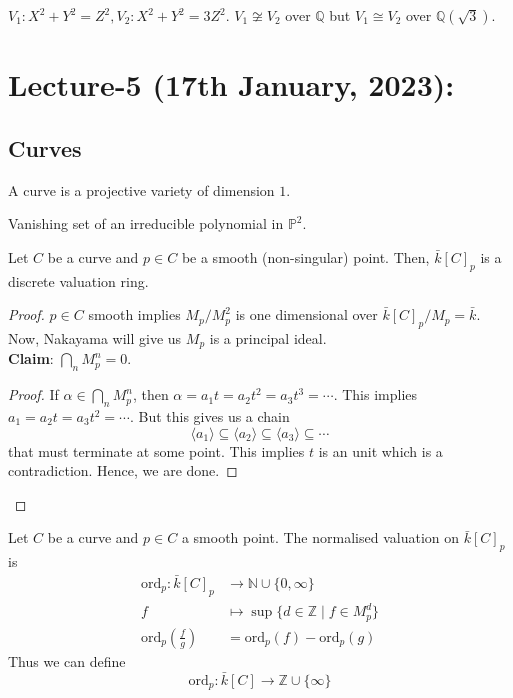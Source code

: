 \documentclass[oneside, 12pt, ]{scrbook}
\newcommand{\NN}{\mathbb N}
\newcommand{\QQ}{\mathbb Q}
\newcommand{\ZZ}{\mathbb Z}
\newcommand{\PP}{\mathbb{P}}
\theoremstyle{theorem}
\begin{document}
\begin{example}
$V_{1}: X^2 + Y^2 = Z^2 , V_{2}: X^2 + Y^2 = 3Z^2$. $V_{1} \not \cong V_{2}$ over $\QQ$ but $V_{1}\cong V_{2}$ over $\QQ(\sqrt{3})$.
\end{example}

\chapter{Lecture-5 (17th January, 2023):}

\section{Curves}

\begin{definition}
A curve is a projective variety of dimension $1$.
\end{definition}

\begin{example}
Vanishing set of an irreducible polynomial in $\PP^2$.
\end{example}

\begin{proposition}
Let $C$ be a curve and $p \in C$ be a smooth (non-singular) point. Then, $\bar{k}[C]_{p}$ is a discrete valuation ring.
\end{proposition}

\begin{proof}
$p \in C$ smooth implies $M_{p}/M_{p}^2$ is one dimensional over $\bar{k}[C]_{p}/M_{p} = \bar{k}$. Now, Nakayama will give us $M_{p}$ is a principal ideal. \\

\textbf{Claim}:
$\bigcap_{n} M_{p}^n = 0$.

\begin{proof}
If $\alpha \in \bigcap_{n} M_{p}^n$, then $\alpha = a_{1}t = a_{2} t^2 = a_{3} t^3 = \cdots $. This implies $a_{1} = a_{2}t = a_{3}t^2 = \cdots $. But this gives us a chain $$\langle a_{1} \rangle \subseteq \langle a_{2} \rangle \subseteq \langle a_{3} \rangle \subseteq \cdots $$ that must terminate at some point. This implies $t$ is an unit which is a contradiction. Hence, we are done.
\end{proof}
\end{proof}

\begin{definition}
Let $C$ be a curve and $p \in C$ a smooth point. The normalised valuation on $\bar{k}[C]_{p}$ is 
\begin{align*}
\mathrm{ord}_{p}: \bar{k}[C]_{p} &\rightarrow \NN \cup \{0, \infty\} \\
f &\mapsto \sup \{d \in \ZZ \mid f \in M_{p}^d \} \\
\mathrm{ord}_{p}(\frac{f}{g}) &= \mathrm{ord}_{p}(f) - \mathrm{ord}_{p}(g)
\end{align*}
Thus we can define $$\mathrm{ord}_{p} : \bar{k}[C] \rightarrow \ZZ \cup \{\infty\}$$
\end{definition}
\end{document}
